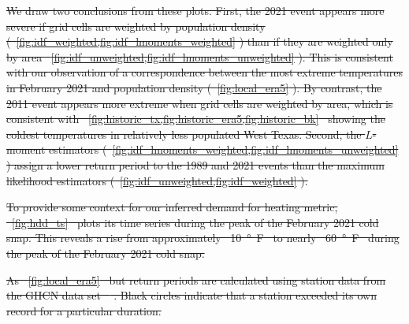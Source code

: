 \documentclass[12pt]{iopart}
\providecommand{\DIFdeltex}[1]{{\protect\color{red}\sout{#1}}}                      %
\providecommand{\DIFdelFL}[1]{\DIFdel{#1}} %
\providecommand{\DIFdel}[1]{\texorpdfstring{\DIFdeltex{#1}}{}} %
\begin{document}
\DIFdel{We draw two conclusions from these plots.
  First, the 2021 event appears more severe if grid cells are weighted by population density (\mbox{%
    \cref{fig:idf_weighted,fig:idf_lmoments_weighted}}\hspace{0pt}%
  ) than if they are weighted only by area \mbox{%
    \cref{fig:idf_unweighted,fig:idf_lmoments_unweighted}}\hspace{0pt}%
  ).
  This is consistent with our observation of a correspondence between the most extreme temperatures in February 2021 and population density (\mbox{%
    \cref{fig:local_era5}}\hspace{0pt}%
  ).
  By contrast, the 2011 event appears more extreme when grid cells are weighted by area, which is consistent with \mbox{%
    \cref{fig:historic_tx,fig:historic_era5,fig:historic_bk} }\hspace{0pt}%
  showing the coldest temperatures in relatively less populated West Texas.
  Second, the $L$-moment estimators (\mbox{%
    \cref{fig:idf_lmoments_weighted,fig:idf_lmoments_unweighted}}\hspace{0pt}%
  ) assign a lower return period to the 1989 and 2021 events than the maximum likelihood estimators (\mbox{%
    \cref{fig:idf_unweighted,fig:idf_weighted}}\hspace{0pt}%
  ).
}%

\DIFdel{To provide some context for our inferred demand for heating metric, \mbox{%
    \cref{fig:hdd_ts} }\hspace{0pt}%
  plots its time series during the peak of the February 2021 cold snap.
  This reveals a rise from approximately \mbox{%
    \SI{10}{\degree F} }\hspace{0pt}%
  to nearly \mbox{%
    \SI{60}{\degree F} }\hspace{0pt}%
  during the peak of the February 2021 cold snap.
}%

{%
  \DIFdelFL{As \mbox{%
      \cref{fig:local_era5} }\hspace{0pt}%
    but return periods are calculated using station data from the GHCN data set \mbox{%
      \cite{Menne:2012hk}}\hspace{0pt}%
    .
    Black circles indicate that a station exceeded its own record for a particular duration.
  }}%
\end{document}
